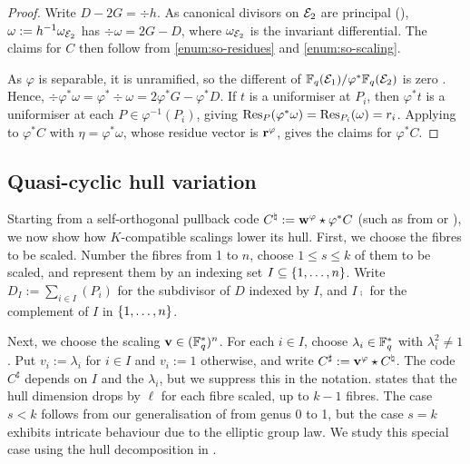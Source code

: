 \documentclass[twocolumn, 11pt]{scrartcl}
\begin{document}
\begin{proof}
    Write $D-2G=\div h$. As canonical divisors on $\mathcal{E}_2$ are principal (), $\omega:=h^{-1}\omega_{\mathcal{E}_2}$ has $\div\omega=2G-D$, where $\omega_{\mathcal{E}_2}$ is the invariant differential. The claims for $C$ then follow from \ref{enum:so-residues} and \ref{enum:so-scaling}.

    As $\varphi$ is separable, it is unramified, so the different of $\mathbb{F}_q(\mathcal{E}_1)/\varphi^*\mathbb{F}_q(\mathcal{E}_2)$ is zero \cite[\S3.4]{stichtenoth2009algebraic}. Hence, $\div\varphi^*\omega=\varphi^*\div\omega=2\varphi^*G-\varphi^*D$. If $t$ is a uniformiser at $P_i$, then $\varphi^*t$ is a uniformiser at each $P\in\varphi^{-1}(P_i)$, giving $\operatorname{Res}_P(\varphi^*\omega)=\operatorname{Res}_{P_i}(\omega)=r_i$. Applying  to $\varphi^*C$ with $\eta=\varphi^*\omega$, whose residue vector is $\mathbf{r}^\varphi$, gives the claims for $\varphi^*C$.
\end{proof}

\subsection{Quasi-cyclic hull variation} \label{subsection:qc-hv}

Starting from a self-orthogonal pullback code $C^\natural:=\mathbf{w}^\varphi\star\varphi^*C$ (such as from  or ), we now show how $K$-compatible scalings lower its hull. First, we choose the fibres to be scaled. Number the fibres from 1 to $n$, choose $1\leq s\leq k$ of them to be scaled, and represent them by an indexing set $I\subseteq\{1,\hdots,n\}$. Write $D_I:=\sum_{i\in I}(P_i)$ for the subdivisor of $D$ indexed by $I$, and $I\comp$ for the complement of $I$ in $\{1,\hdots,n\}$.

Next, we choose the scaling $\mathbf{v}\in(\mathbb{F}_q^*)^n$. For each $i\in I$, choose $\lambda_i\in\mathbb{F}_q^*$ with $\lambda_i^2\neq1$. Put $v_i:=\lambda_i$ for $i\in I$ and $v_i:=1$ otherwise, and write $C^\sharp:=\mathbf{v}^\varphi\star C^\natural$.
The code $C^\sharp$ depends on $I$ and the $\lambda_i$, but we suppress this in the notation.  states that the hull dimension drops by $\ell$ for each fibre scaled, up to $k-1$ fibres. The case $s<k$ follows from our generalisation of \cite[Thm.~1(i)]{fang2020euclidean} from genus 0 to 1, but the case $s=k$ exhibits intricate behaviour due to the elliptic group law. We study this special case using the hull decomposition in .
\end{document}
